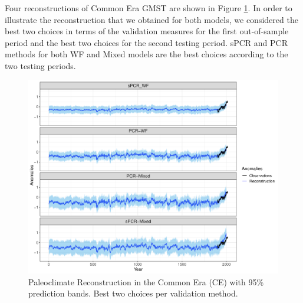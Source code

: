 \documentclass[12pt]{amsart}
\theoremstyle{plain}
\theoremstyle{definition}
\theoremstyle{remark}
\newcommand{\lb}[1]{\color{MidnightBlue}\textbf{[LB: #1]}\normalcolor}
\newcommand{\jeg}[1]{\color{ProcessBlue}\textbf{[JEG: #1]}\normalcolor}
\begin{document}
 Four reconstructions of Common Era GMST
are shown in Figure \ref{fig:paleoCE1}.
In order to illustrate the reconstruction that we obtained for both models, we considered the best two choices in terms of the validation measures for the
first out-of-sample period  and the best two choices for the second testing
period. sPCR and PCR methods for both WF and Mixed models are the best choices
according to the two testing periods.

\begin{figure}
  \centering
  \includegraphics[scale=0.40]{RecCE_Final}
  \caption{Paleoclimate Reconstruction in the Common Era (CE) with 95\%
    prediction bands. Best two choices per validation method.}
  \label{fig:paleoCE1}
\end{figure}

\end{document}
